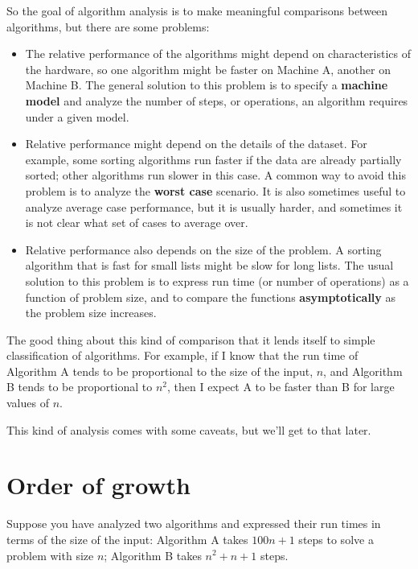\documentclass[10pt]{book}
\begin{document}
So the goal of algorithm analysis is to make meaningful
comparisons between algorithms, but there are some problems:

\begin{itemize}

\item The relative performance of the algorithms might
depend on characteristics of the hardware, so one algorithm
might be faster on Machine A, another on Machine B.
The general solution to this problem is to specify a
{\bf machine model} and analyze the number of steps, or
operations, an algorithm requires under a given model.

\item Relative performance might depend on the details of
the dataset.  For example, some sorting
algorithms run faster if the data are already partially sorted;
other algorithms run slower in this case.
A common way to avoid this problem is to analyze the
{\bf worst case} scenario.  It is also sometimes useful to
analyze average case performance, but it is usually harder,
and sometimes it is not clear what set of cases to average over.

\item Relative performance also depends on the size of the
problem.  A sorting algorithm that is fast for small lists
might be slow for long lists.
The usual solution to this problem is to express run time
(or number of operations) as a function of problem size,
and to compare the functions {\bf asymptotically} as the problem
size increases.

\end{itemize}

The good thing about this kind of comparison that it lends
itself to simple classification of algorithms.  For example,
if I know that the run time of Algorithm A tends to be
proportional to the size of the input, $n$, and Algorithm B
tends to be proportional to $n^2$, then I
expect A to be faster than B for large values of $n$.

This kind of analysis comes with some caveats, but we'll get
to that later.


\section{Order of growth}

Suppose you have analyzed two algorithms and expressed
their run times in terms of the size of the input:
Algorithm A takes $100 n + 1$ steps to solve a problem with
size $n$; Algorithm B takes $n^2 + n + 1$ steps.
\end{document}
